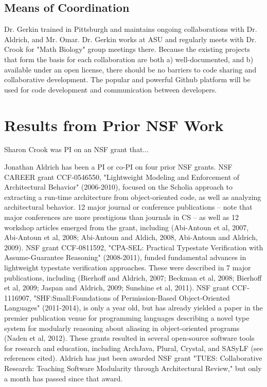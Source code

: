 \documentclass[11pt,letterpaper]{article}
\begin{document}
\subsection{Means of Coordination}
Dr. Gerkin trained in Pittsburgh and maintains ongoing collaborations with Dr. Aldrich, and Mr. Omar.  Dr. Gerkin works at ASU and regularly meets with Dr. Crook for "Math Biology" group meetings there.  Because the existing projects that form the basis for each collaboration are both a) well-documented, and b) available under an open license, there should be no barriers to code sharing and collaborative development.  The popular and powerful Github platform will be used for code development and communication between developers.

\section{Results from Prior NSF Work}
Sharon Crook was PI on an NSF grant that... 

Jonathan Aldrich has been a PI or co-PI on four prior NSF grants.  NSF CAREER grant CCF-0546550, "Lightweight Modeling and Enforcement of Architectural Behavior" (2006-2010), focused on the Scholia approach to extracting a run-time architecture from object-oriented code, as well as analyzing architectural behavior.  12 major journal or conference publications -- note that major conferences are more prestigious than journals in CS -- as well as 12 workshop articles emerged from the grant, including (Abi-Antoun et al, 2007, Abi-Antoun et al, 2008; Abi-Antoun and Aldich, 2008, Abi-Antoun and Aldrich, 2009).  NSF grant CCF-0811592, "CPA-SEL: Practical Typestate Verification with Assume-Guarantee Reasoning" (2008-2011), funded fundamental advances in lightweight typestate verification approaches.  These were described in 7 major publications, including (Bierhoff and Aldrich, 2007; Beckman et al, 2008; Bierhoff et al, 2009; Jaspan and Aldrich, 2009; Sunshine et al, 2011).  NSF grant CCF-1116907, "SHF:Small:Foundations of Permission-Based Object-Oriented Languages" (2011-2014), is only a year old, but has already yielded a paper in the premier publication venue for programming languages describing a novel type system for modularly reasoning about aliasing in object-oriented programs (Naden et al, 2012).  These grants resulted in several open-source software tools for research and education, including ArchJava, Plural, Crystal, and SASyLF (see references cited).  Aldrich has just been awarded NSF grant "TUES: Collaborative Research: Teaching Software Modularity through Architectural Review," but only a month has passed since that award.
\end{document}
